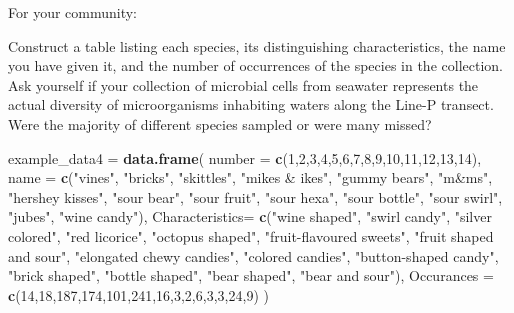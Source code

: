 \documentclass[]{article}
\newenvironment{Shaded}{\begin{snugshade}}{\end{snugshade}}
\newcommand{\KeywordTok}[1]{\textcolor[rgb]{0.13,0.29,0.53}{\textbf{#1}}}
\newcommand{\DataTypeTok}[1]{\textcolor[rgb]{0.13,0.29,0.53}{#1}}
\newcommand{\DecValTok}[1]{\textcolor[rgb]{0.00,0.00,0.81}{#1}}
\newcommand{\StringTok}[1]{\textcolor[rgb]{0.31,0.60,0.02}{#1}}
\newcommand{\NormalTok}[1]{#1}
\begin{document}
For your community:

Construct a table listing each species, its distinguishing
characteristics, the name you have given it, and the number of
occurrences of the species in the collection. Ask yourself if your
collection of microbial cells from seawater represents the actual
diversity of microorganisms inhabiting waters along the Line-P transect.
Were the majority of different species sampled or were many missed?

\begin{Shaded}
\begin{Highlighting}[]
\NormalTok{example_data4 =}\StringTok{ }\KeywordTok{data.frame}\NormalTok{(}
  \DataTypeTok{number =} \KeywordTok{c}\NormalTok{(}\DecValTok{1}\NormalTok{,}\DecValTok{2}\NormalTok{,}\DecValTok{3}\NormalTok{,}\DecValTok{4}\NormalTok{,}\DecValTok{5}\NormalTok{,}\DecValTok{6}\NormalTok{,}\DecValTok{7}\NormalTok{,}\DecValTok{8}\NormalTok{,}\DecValTok{9}\NormalTok{,}\DecValTok{10}\NormalTok{,}\DecValTok{11}\NormalTok{,}\DecValTok{12}\NormalTok{,}\DecValTok{13}\NormalTok{,}\DecValTok{14}\NormalTok{),}
  \DataTypeTok{name =} \KeywordTok{c}\NormalTok{(}\StringTok{"vines"}\NormalTok{, }\StringTok{"bricks"}\NormalTok{, }\StringTok{"skittles"}\NormalTok{, }\StringTok{"mikes & ikes"}\NormalTok{, }\StringTok{"gummy bears"}\NormalTok{, }\StringTok{"m&ms"}\NormalTok{, }\StringTok{"hershey kisses"}\NormalTok{, }\StringTok{"sour bear"}\NormalTok{, }\StringTok{"sour fruit"}\NormalTok{, }\StringTok{"sour hexa"}\NormalTok{, }\StringTok{"sour bottle"}\NormalTok{, }\StringTok{"sour swirl"}\NormalTok{, }\StringTok{"jubes"}\NormalTok{, }\StringTok{"wine candy"}\NormalTok{),}
  \DataTypeTok{Characteristics=} \KeywordTok{c}\NormalTok{(}\StringTok{"wine shaped"}\NormalTok{, }\StringTok{"swirl candy"}\NormalTok{, }\StringTok{"silver colored"}\NormalTok{, }\StringTok{"red licorice"}\NormalTok{, }\StringTok{"octopus shaped"}\NormalTok{, }\StringTok{"fruit-flavoured sweets"}\NormalTok{, }\StringTok{"fruit shaped and sour"}\NormalTok{, }\StringTok{"elongated chewy candies"}\NormalTok{, }\StringTok{"colored candies"}\NormalTok{, }\StringTok{"button-shaped candy"}\NormalTok{, }\StringTok{"brick shaped"}\NormalTok{, }\StringTok{"bottle shaped"}\NormalTok{, }\StringTok{"bear shaped"}\NormalTok{, }\StringTok{"bear and sour"}\NormalTok{),}
  \DataTypeTok{Occurances =} \KeywordTok{c}\NormalTok{(}\DecValTok{14}\NormalTok{,}\DecValTok{18}\NormalTok{,}\DecValTok{187}\NormalTok{,}\DecValTok{174}\NormalTok{,}\DecValTok{101}\NormalTok{,}\DecValTok{241}\NormalTok{,}\DecValTok{16}\NormalTok{,}\DecValTok{3}\NormalTok{,}\DecValTok{2}\NormalTok{,}\DecValTok{6}\NormalTok{,}\DecValTok{3}\NormalTok{,}\DecValTok{3}\NormalTok{,}\DecValTok{24}\NormalTok{,}\DecValTok{9}\NormalTok{)}
\NormalTok{)}
\end{Highlighting}
\end{Shaded}
\end{document}
